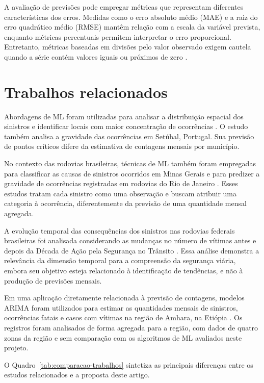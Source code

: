 \documentclass[12pt]{article}
\begin{document}
A avaliação de previsões pode empregar métricas que representam diferentes características dos erros. Medidas como o erro absoluto médio (MAE) e a raiz do erro quadrático médio (RMSE) mantêm relação com a escala da variável prevista, enquanto métricas percentuais permitem interpretar o erro proporcional. Entretanto, métricas baseadas em divisões pelo valor observado exigem cautela quando a série contém valores iguais ou próximos de zero \cite{hyndman2006measures}.

\section{Trabalhos relacionados}

Abordagens de ML foram utilizadas para analisar a distribuição espacial dos sinistros e identificar locais com maior concentração de ocorrências \cite{santos2021machine}. O estudo também analisa a gravidade das ocorrências em Setúbal, Portugal. Sua previsão de pontos críticos difere da estimativa de contagens mensais por município.

No contexto das rodovias brasileiras, técnicas de ML também foram empregadas para classificar as causas de sinistros ocorridos em Minas Gerais \cite{rosa2024classificacao} e para predizer a gravidade de ocorrências registradas em rodovias do Rio de Janeiro \cite{mafort2025tecnicas}. Esses estudos tratam cada sinistro como uma observação e buscam atribuir uma categoria à ocorrência, diferentemente da previsão de uma quantidade mensal agregada.

A evolução temporal das consequências dos sinistros nas rodovias federais brasileiras foi analisada considerando as mudanças no número de vítimas antes e depois da Década de Ação pela Segurança no Trânsito \cite{andrade2019tendencia}. Essa análise demonstra a relevância da dimensão temporal para a compreensão da segurança viária, embora seu objetivo esteja relacionado à identificação de tendências, e não à produção de previsões mensais.

Em uma aplicação diretamente relacionada à previsão de contagens, modelos ARIMA foram utilizados para estimar as quantidades mensais de sinistros, ocorrências fatais e casos com vítimas na região de Amhara, na Etiópia \cite{getahun2021timeseries}. Os registros foram analisados de forma agregada para a região, com dados de quatro zonas da região e sem comparação com os algoritmos de ML avaliados neste projeto.

O Quadro~\ref{tab:comparacao-trabalhos} sintetiza as principais diferenças entre os estudos relacionados e a proposta deste artigo.
\end{document}
